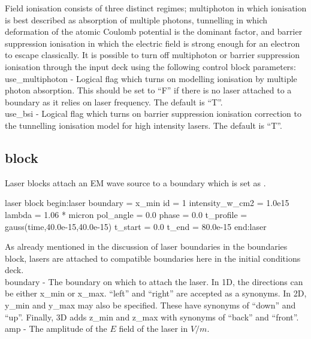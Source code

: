 Field ionisation consists of three distinct regimes; multiphoton in which
ionisation is best described as absorption of multiple photons, tunnelling
in which deformation of the atomic Coulomb potential is the dominant factor,
and barrier suppression ionisation in which the electric field is strong
enough for an electron to escape classically. It is possible to turn off
multiphoton or barrier suppression ionisation through the input deck
using the following control block parameters:\\

{\emphtext use\_multiphoton} - Logical flag which turns on modelling
  ionisation by multiple photon absorption. This should be set to ``F'' if
  there is no laser attached to a boundary as it relies on laser frequency.
  The default is ``T''.\\

{\emphtext use\_bsi} - Logical flag which turns on barrier suppression
  ionisation correction to the tunnelling ionisation model for high intensity
  lasers. The default is ``T''.\\

\subsection{ block}
\label{sec:laser_block}
Laser blocks attach an EM wave source to a boundary which is set as
.
\begin{lboxverbatim}{laser block}
begin:laser
   boundary = x_min
   id = 1
   intensity_w_cm2 = 1.0e15
   lambda = 1.06 * micron
   pol_angle = 0.0
   phase = 0.0
   t_profile = gauss(time,40.0e-15,40.0e-15)
   t_start = 0.0
   t_end = 80.0e-15
end:laser
\end{lboxverbatim}

As already mentioned in the discussion of laser boundaries in the boundaries
block, lasers are attached to compatible boundaries here in the initial
conditions deck.\\

{\emphtext boundary} - The boundary on which to attach the laser.
  In 1D, the directions can be either x\_min or x\_max.  ``left'' and ``right''
  are accepted as a synonyms. In 2D, y\_min and y\_max may also be specified.
  These have synonyms of ``down'' and ``up''. Finally, 3D adds z\_min and z\_max
  with synonyms of ``back'' and ``front''.\\

{\emphtext amp} - The amplitude of the $E$ field of the laser in $V/m$.\\

